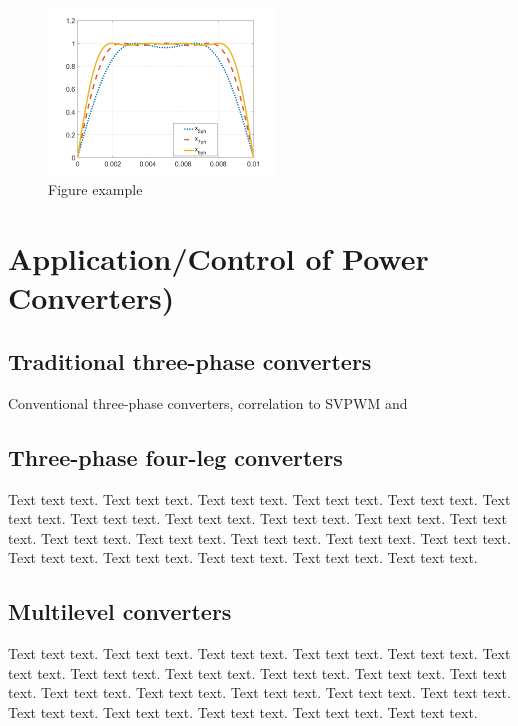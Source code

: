 \documentclass[journal]{IEEEtranTIE}
\begin{document}
\begin{figure}
\noindent \begin{centering}
\includegraphics[width=6cm]{Figures/optimized_flux_waveform_5_7_9ph}
\par\end{centering}
\caption{\label{fig:optimal-ratio-harmonics} Figure example}
\end{figure}


\section{Application/Control of Power Converters)}

\subsection{Traditional three-phase converters}

Conventional three-phase converters, correlation to SVPWM and 

\subsection{Three-phase four-leg converters}

Text text text. Text text text. Text text text. Text text text. Text
text text. Text text text. Text text text. Text text text. Text text
text. Text text text. Text text text. Text text text. Text text text.
Text text text. Text text text. Text text text. Text text text. Text
text text. Text text text. Text text text. Text text text.

\subsection{Multilevel converters}

Text text text. Text text text. Text text text. Text text text. Text
text text. Text text text. Text text text. Text text text. Text text
text. Text text text. Text text text. Text text text. Text text text.
Text text text. Text text text. Text text text. Text text text. Text
text text. Text text text. Text text text. Text text text.
\end{document}
